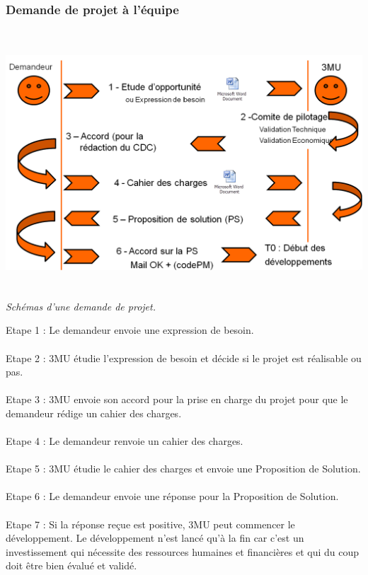 \documentclass[a4paper,twoside,12pt]{report}
\begin{document}
\subsubsection{Demande de projet à l'équipe}
\begin{center}
\includegraphics[height=10cm]{Demande_projet.PNG}\\
\itshape Schémas d'une demande de projet.
\end{center}
\vspace{1cm}
Etape 1 :	Le demandeur envoie une expression de besoin.\\\\
Etape 2 :	3MU  étudie l’expression de besoin et décide si  le projet est réalisable ou pas.\\\\
Etape 3 :	3MU envoie son accord pour la prise en charge du projet pour que le demandeur rédige un cahier des charges.\\\\
Etape 4 :	Le demandeur renvoie un cahier des charges.\\\\
Etape 5 :	3MU étudie le cahier des charges et envoie une Proposition de Solution.\\\\
Etape 6 :	Le demandeur envoie une réponse pour la Proposition de Solution.\\\\
Etape 7 :	Si la réponse reçue est positive, 3MU peut commencer le développement.
Le développement n’est lancé qu’à la fin car c’est un investissement qui nécessite des ressources humaines et financières et qui du coup doit être bien évalué et validé.
\newpage
\end{document}
